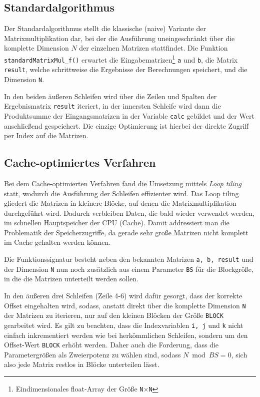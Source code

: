 \documentclass[a4paper,11pt]{scrartcl}
\begin{document}
\subsection{Standardalgorithmus}
Der Standardalgorithmus stellt die klassische (naive) Variante der Matrixmultiplikation
dar, bei der die Ausführung uneingeschränkt über die komplette Dimension $N$ der einzelnen Matrizen 
stattfindet. Die Funktion \texttt{standardMatrixMul\_f()} erwartet die Eingabematrizen\footnote{
Eindimensionales float-Array der Größe \texttt{N$\times$N}} \texttt{a} und \texttt{b},
die Matrix \texttt{result}, welche schrittweise die Ergebnisse der Berechnungen speichert, 
und die Dimension \texttt{N}.\newline




In den beiden äußeren Schleifen 
wird über die Zeilen und Spalten der Ergebnismatrix \texttt{result} iteriert,
in der innersten Schleife wird dann die Produktsumme der Eingangsmatrizen in der
Variable \texttt{calc} gebildet und der Wert anschließend gespeichert.
Die einzige Optimierung ist hierbei der direkte Zugriff per Index auf die Matrizen.


\subsection{Cache-optimiertes Verfahren}
Bei dem Cache-optimierten Verfahren fand die Umsetzung mittels \emph{Loop tiling} statt,
wodurch die Ausführung der Schleifen effizienter wird. Das Loop tiling gliedert die 
Matrizen in kleinere Blöcke, auf denen die Matrixmultiplikation durchgeführt wird.
Dadurch verbleiben Daten, die bald wieder verwendet werden, im schnellen Hauptspeicher der 
CPU (Cache). Damit addressiert man die Problematik der Speicherzugriffe, da gerade sehr große
Matrizen nicht komplett im Cache gehalten werden können.



Die Funktionssignatur besteht neben den bekannten Matrizen \texttt{a, b, result}
und der Dimension \texttt{N} nun noch zusätzlich aus einem Parameter \texttt{BS} für 
die Blockgröße, in die die Matrizen unterteilt werden sollen.\newline

In den äußeren drei Schleifen (Zeile 4-6) wird dafür gesorgt, dass der korrekte Offset eingehalten wird,
sodass, anstatt direkt über die komplette Dimension \texttt{N} der Matrizen zu iterieren, nur auf den
kleinen Blöcken der Größe \texttt{BLOCK} gearbeitet wird. Es gilt zu beachten, dass die Indexvariablen
\texttt{i,~j} und \texttt{k} nicht einfach inkrementiert werden wie bei herkömmlichen Schleifen,
sondern um den Offset-Wert \texttt{BLOCK} erhöht werden. Daher auch die Forderung, dass 
die Parametergrößen als Zweierpotenz zu wählen sind, sodass $N \bmod BS = 0$, sich also jede 
Matrix restlos in Blöcke unterteilen lässt.\newline
\end{document}
